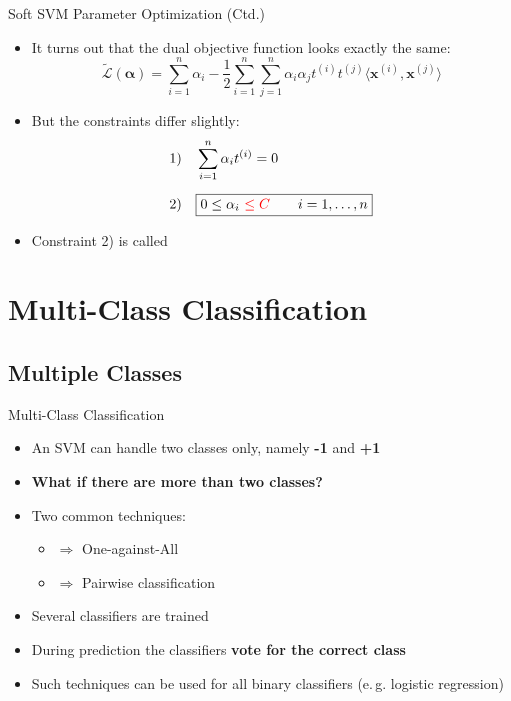 \begin{frame}{Soft SVM Parameter Optimization (Ctd.)}{}
	\begin{itemize}
		\item It turns out that the dual objective function looks exactly the same:
		\begin{equation}
			\widetilde{\mathcal{L}}(\bm{\alpha}) =
				\sum_{i=1}^n \alpha_i - \frac{1}{2} \sum_{i=1}^n \sum_{j=1}^n
				\alpha_i \alpha_j t^{(i)} t^{(j)} \langle \bm{x}^{(i)}, \bm{x}^{(j)} \rangle
		\end{equation}
		\item But the constraints differ slightly:
		\footnotesize
		\begin{align}
			&1) \quad \sum_{i=1}^n \alpha_i t^{(i)} = 0 \\[2mm]
			&2) \quad \boxed{0 \le \alpha_i\ \textcolor{red}{\le C} \qquad i = 1, \dots, n} 
		\end{align}
		\normalsize
		\item Constraint 2) is called 
	\end{itemize}
\end{frame}


\section{Multi-Class Classification}

\subsection{Multiple Classes}

\begin{frame}{Multi-Class Classification}{}
	\begin{itemize}
		\item An SVM can handle two classes only, namely \textbf{-1} and \textbf{+1}
		\item \textbf{What if there are more than two classes?}
		\item Two common techniques:
		\begin{itemize}
			\item {} 	$\Rightarrow$ One-against-All
			\item {} 	$\Rightarrow$ Pairwise classification
		\end{itemize}
		\item Several classifiers are trained
		\item During prediction the classifiers \textbf{vote for the correct class}
		\item Such techniques can be used for all binary classifiers (e.\,g. logistic regression)
	\end{itemize}
\end{frame}


